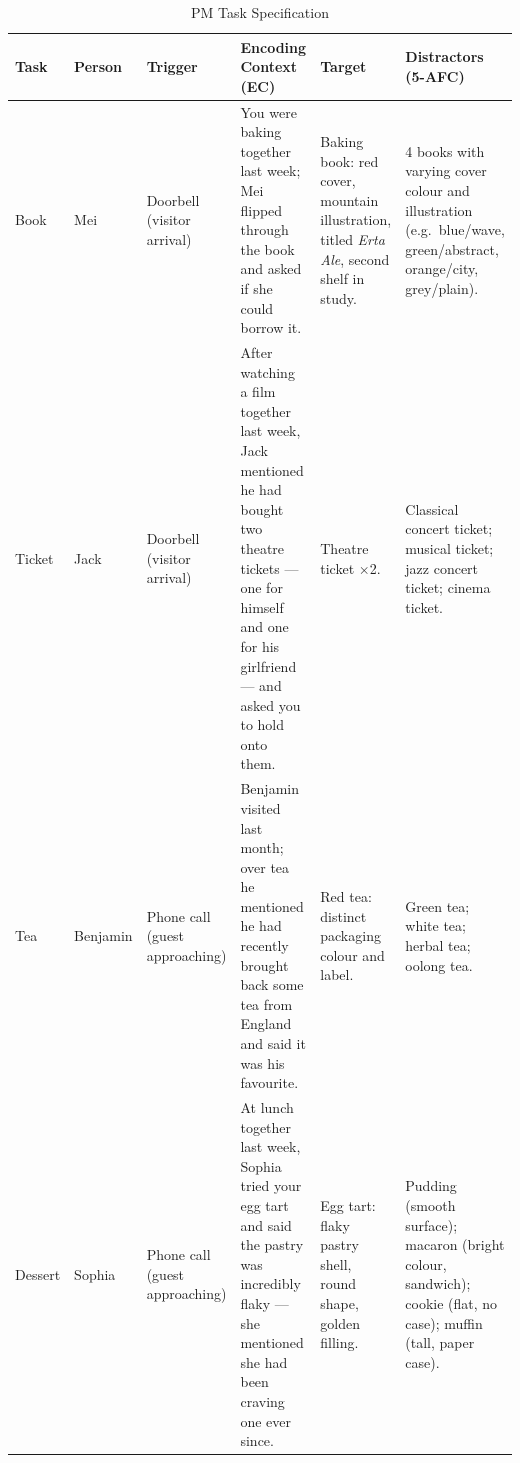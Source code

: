 \begin{table}[h]
    \centering
    \caption{PM Task Specification}
    \label{tab:task_spec}
    \begin{tabular}{p{1.2cm} p{1.2cm} p{1.5cm} p{3cm} p{2cm} p{3.5cm}}
        \hline
        \textbf{Task} & \textbf{Person} & \textbf{Trigger} & \textbf{Encoding Context (EC)} & \textbf{Target} & \textbf{Distractors (5-AFC)} \\
        \hline

        Book &
        Mei &
        Doorbell (visitor arrival) &
        You were baking together last week; Mei flipped through the book and asked if she could borrow it. &
        Baking book: red cover, mountain illustration, titled \textit{Erta Ale}, second shelf in study. &
        4 books with varying cover colour and illustration (e.g.\ blue/wave, green/abstract, orange/city, grey/plain). \\
        \addlinespace

        Ticket &
        Jack &
        Doorbell (visitor arrival) &
        After watching a film together last week, Jack mentioned he had bought two theatre tickets — one for himself and one for his girlfriend — and asked you to hold onto them. &
        Theatre ticket $\times$2. &
        Classical concert ticket; musical ticket; jazz concert ticket; cinema ticket. \\
        \addlinespace

        Tea &
        Benjamin &
        Phone call (guest approaching) &
        Benjamin visited last month; over tea he mentioned he had recently brought back some tea from England and said it was his favourite. &
        Red tea: distinct packaging colour and label. &
        Green tea; white tea; herbal tea; oolong tea. \\
        \addlinespace

        Dessert &
        Sophia &
        Phone call (guest approaching) &
        At lunch together last week, Sophia tried your egg tart and said the pastry was incredibly flaky — she mentioned she had been craving one ever since. &
        Egg tart: flaky pastry shell, round shape, golden filling. &
        Pudding (smooth surface); macaron (bright colour, sandwich); cookie (flat, no case); muffin (tall, paper case). \\

        \hline
    \end{tabular}
\end{table}
